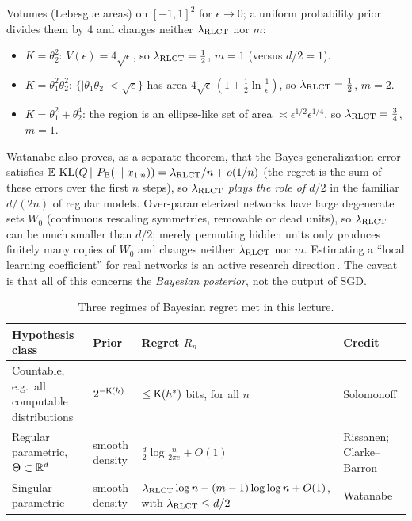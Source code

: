 \begin{beyond}
Volumes (Lebesgue areas) on $[-1,1]^2$ for $\epsilon\to0$; a uniform probability prior divides them by $4$ and changes neither $\lambda_{\mathrm{RLCT}}$ nor $m$:
\begin{itemize}
  \item $K=\theta_2^2$: $V(\epsilon)=4\sqrt\epsilon$, so $\lambda_{\mathrm{RLCT}}=\tfrac12$, $m=1$ (versus $d/2=1$).
  \item $K=\theta_1^2\theta_2^2$: $\{|\theta_1\theta_2|<\sqrt\epsilon\}$ has area $4\sqrt\epsilon\,(1+\tfrac12\ln\tfrac1\epsilon)$, so $\lambda_{\mathrm{RLCT}}=\tfrac12$, $m=2$.
  \item $K=\theta_1^2+\theta_2^4$: the region is an ellipse-like set of area $\asymp\epsilon^{1/2}\epsilon^{1/4}$, so $\lambda_{\mathrm{RLCT}}=\tfrac34$, $m=1$.
\end{itemize}
Watanabe also proves, as a separate theorem, that the Bayes generalization error satisfies $\mathbb{E}\,\operatorname{KL}(Q\,\|\,P_{\mathrm{B}}(\cdot\mid x_{1:n}))=\lambda_{\mathrm{RLCT}}/n+o(1/n)$ (the regret is the sum of these errors over the first $n$ steps), so \emph{$\lambda_{\mathrm{RLCT}}$ plays the role of $d/2$} in the familiar $d/(2n)$ of regular models. Over-parameterized networks have large degenerate sets $W_0$ (continuous rescaling symmetries, removable or dead units), so $\lambda_{\mathrm{RLCT}}$ can be much smaller than $d/2$; merely permuting hidden units only produces finitely many copies of $W_0$ and changes neither $\lambda_{\mathrm{RLCT}}$ nor $m$.
Estimating a ``local learning coefficient'' for real networks is an active research direction\,\citep{lau2023}. The caveat is that all of this concerns the \emph{Bayesian posterior}, not the output of SGD.
\end{beyond}

\begin{table}[tb]
\centering\small
\renewcommand{\arraystretch}{1.3}
\begin{tabular}{@{}>{\raggedright\arraybackslash}p{33mm}>{\raggedright\arraybackslash}p{23mm}>{\raggedright\arraybackslash}p{39mm}>{\raggedright\arraybackslash}p{16mm}@{}}
\toprule
\textbf{Hypothesis class} & \textbf{Prior} & \textbf{Regret $R_n$} & \textbf{Credit}\\
\midrule
Countable, e.g.\ all computable distributions & $2^{-\mathsf{K}(h)}$ & $\le\mathsf{K}(h^*)$ bits, for all $n$ & Solomonoff\\
Regular parametric, $\Theta\subset\mathbb{R}^d$ & smooth density & $\tfrac d2\log\frac n{2\pi e}+O(1)$ & Rissanen; Clarke--Barron\\
Singular parametric & smooth density & $\lambda_{\mathrm{RLCT}}\log n-(m-1)\log\log n+O(1)$, with $\lambda_{\mathrm{RLCT}}\le d/2$ & Watanabe\\
\bottomrule
\end{tabular}
\caption{Three regimes of Bayesian regret met in this lecture.}
\end{table}

